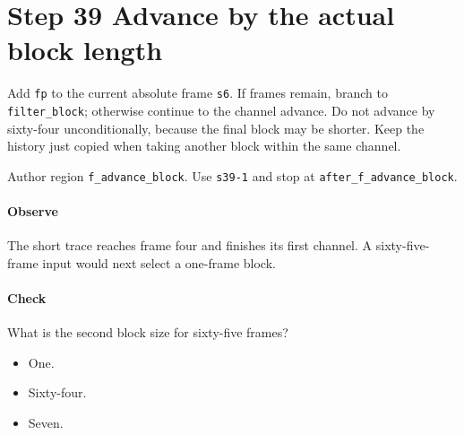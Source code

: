 \section{Step 39 Advance by the actual block length}\label{pcm-wav-s39}
Add \texttt{fp} to the current absolute frame \texttt{s6}. If frames remain, branch to \texttt{filter\_block}; otherwise continue to the channel advance. Do not advance by sixty-four unconditionally, because the final block may be shorter. Keep the history just copied when taking another block within the same channel.

Author region \texttt{f\_advance\_block}. Use \texttt{s39-1} and stop at \texttt{after\_f\_advance\_block}.

\paragraph{Observe} The short trace reaches frame four and finishes its first channel. A sixty-five-frame input would next select a one-frame block.

\paragraph{Check} What is the second block size for sixty-five frames?
\begin{itemize}
  \item[A.] One.
  \item[B.] Sixty-four.
  \item[C.] Seven.
\end{itemize}
